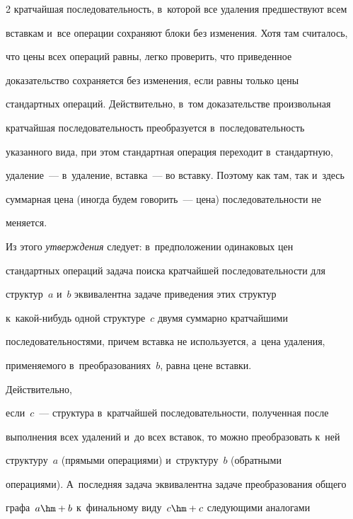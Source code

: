 \begin{multicols}{2}
кратчайшая последовательность, в~которой все удаления предшествуют всем 


вставкам и~все операции сохраняют блоки без изменения. Хотя там считалось, 


что цены всех операций равны, легко проверить, что приведенное 


доказательство сохраняется без изменения, если равны только цены\linebreak 


стандартных операций. Действительно, в~том доказательстве произвольная 


кратчайшая последовательность преобразуется в~последовательность 


указанного вида, при этом стандартная операция перехо\-дит в~стандартную, 


удаление~--- в~удаление, вставка~--- во вставку. Поэтому как там, так и~здесь 


суммарная цена (иногда будем говорить~--- цена) последовательности не 


меняется.








  


  Из этого \textit{утверждения} следует: в~предположении одинаковых цен 


стандартных операций задача поиска кратчайшей последовательности для 


структур~$a$ и~$b$ эквивалентна задаче приведения этих структур  


к~ка\-кой-ни\-будь одной структуре~$c$ двумя суммарно кратчайшими 


последовательностями, причем вставка не используется, а~цена удаления, 


применяемого в~преобразованиях~$b$, равна цене вставки. 





Действительно, 


если~$c$~--- структура в~кратчайшей последовательности, полученная после 


выполнения всех удалений и~до всех вставок, то можно преобразовать к~ней 


структуру~$a$ (прямыми операциями) и~структуру~$b$ (обратными 


операциями). А~последняя задача эквивалентна задаче преобразования общего 


графа~$a\hm+b$ к~финальному виду~$c\hm+c$ следующими аналогами 



\end{multicols}

